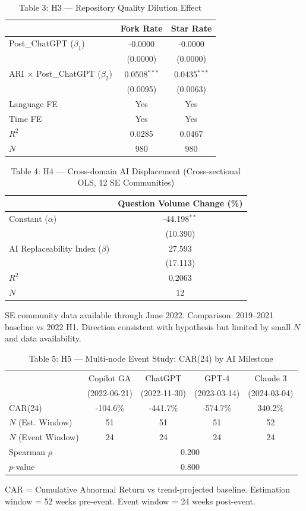 \documentclass[12pt]{article}
\begin{document}
\begin{table}[htbp]
\centering
\caption{Table 3: H3 --- Repository Quality Dilution Effect}
\begin{tabular}{lcc}
\toprule
 & Fork Rate & Star Rate \\
\midrule
Post\_ChatGPT ($\beta_1$) & -0.0000 & -0.0000 \\
 & (0.0000) & (0.0000) \\
ARI $\times$ Post\_ChatGPT ($\beta_2$) & 0.0508$^{***}$ & 0.0435$^{***}$ \\
 & (0.0095) & (0.0063) \\
\midrule
Language FE & Yes & Yes \\
Time FE & Yes & Yes \\
$R^2$ & 0.0285 & 0.0467 \\
$N$ & 980 & 980 \\
\bottomrule
\end{tabular}
\end{table}

\begin{table}[htbp]
\centering
\caption{Table 4: H4 --- Cross-domain AI Displacement (Cross-sectional OLS, 12 SE Communities)}
\begin{tabular}{lc}
\toprule
 & Question Volume Change (\%) \\
\midrule
Constant ($\alpha$) & -44.198$^{**}$ \\
 & (10.390) \\
AI Replaceability Index ($\beta$) & 27.593 \\
 & (17.113) \\
\midrule
$R^2$ & 0.2063 \\
$N$ & 12 \\
\bottomrule
\end{tabular}
\par\smallskip
{\footnotesize SE community data available through June 2022. Comparison: 2019--2021 baseline vs 2022 H1. Direction consistent with hypothesis but limited by small $N$ and data availability.}
\end{table}

\begin{table}[htbp]
\centering
\caption{Table 5: H5 --- Multi-node Event Study: CAR(24) by AI Milestone}
\begin{tabular}{lcccc}
\toprule
 & Copilot GA & ChatGPT & GPT-4 & Claude 3 \\
 & (2022-06-21) & (2022-11-30) & (2023-03-14) & (2024-03-04) \\
\midrule
CAR(24) & -104.6\% & -441.7\% & -574.7\% & 340.2\% \\
$N$ (Est. Window) & 51 & 51 & 51 & 52 \\
$N$ (Event Window) & 24 & 24 & 24 & 24 \\
\midrule
Spearman $\rho$ & \multicolumn{4}{c}{0.200} \\
$p$-value & \multicolumn{4}{c}{0.800} \\
\bottomrule
\end{tabular}
\par\smallskip
{\footnotesize CAR = Cumulative Abnormal Return vs trend-projected baseline. Estimation window = 52 weeks pre-event. Event window = 24 weeks post-event.}
\end{table}
\end{document}
